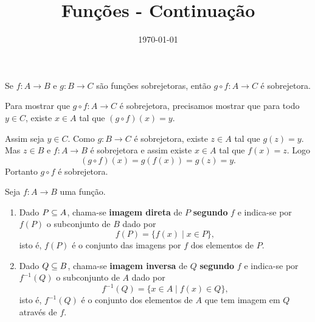 \documentclass{beamer}
\title{Fun\c{c}\~oes - Continuação}
\author[\autor]{\autor}
\institute[\instituto]{\instituto}
\date{\today}
\begin{document}
    \begin{frame}
        \maketitle
    \end{frame}


    \begin{frame}
\begin{proposicao}
    Se $f : A \to B$ e $g : B \to C$ s{\~a}o fun\c{c}\~oes sobrejetoras, ent{\~a}o $g\circ f : A \to C$ {\'e} sobrejetora.
\end{proposicao}
\begin{prova}
    Para mostrar que $g \circ f : A \to C$ \'e sobrejetora, precisamos mostrar que para todo $y \in C$, existe $x \in A$ tal que $(g\circ f)(x) = y$.

    Assim seja $y \in C$. Como $g : B \to C$ \'e sobrejetora, existe $z \in A$ tal que $g(z) = y$. Mas $z \in B$ e $f : A \to B$ \'e sobrejetora e assim existe $x \in A$ tal que $f(x) = z$. Logo
    \[
        (g\circ f)(x) = g(f(x)) = g(z) = y.
    \]
    Portanto $g \circ f$ \'e sobrejetora.
\end{prova}
    \end{frame}

    \begin{frame}
\begin{definicao}
    Seja $f : A \to B$ uma fun{\c c}{\~a}o.
    \begin{enumerate}[label={\roman*})]
        \item Dado $P \subseteq A$, chama-se \textbf{imagem direta} de $P$  \textbf{segundo} $f$ e indica-se por $f(P)$ o subconjunto de $B$ dado por
        \[
            f(P) = \{f(x) \mid x \in P\},
        \]
        isto {\'e}, $f(P)$ {\'e} o conjunto das imagens por $f$ dos elementos de $P$.

        \item Dado $Q \subseteq B$, chama-se \textbf{imagem inversa} de $Q$ \textbf{segundo} $f$ e indica-se por $f^{-1}(Q)$ o subconjunto de $A$ dado por
        \[
            f^{-1}(Q) = \{x \in A \mid f(x) \in Q\},
        \]
        isto {\'e}, $f^{-1}(Q)$ {\'e} o conjunto dos elementos de $A$ que tem imagem em $Q$ atrav{\'e}s de $f$.
    \end{enumerate}
\end{definicao}
    \end{frame}
\end{document}
